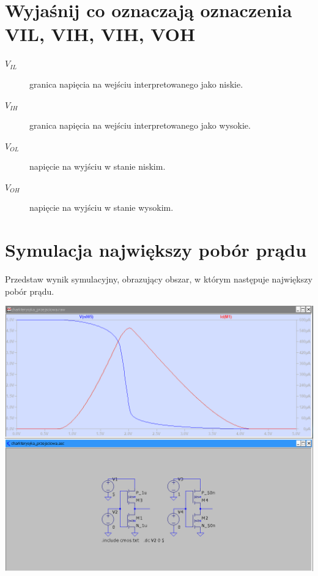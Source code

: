 \documentclass[a4paper, 11pt]{article}
\begin{document}

\section{Wyjaśnij co oznaczają oznaczenia VIL, VIH, VIH, VOH}\label{sec:oznaczenia} %

\begin{description}
	\item[$V_{IL}$] granica napięcia na wejściu interpretowanego jako niskie.
	\item[$V_{IH}$] granica napięcia na wejściu interpretowanego jako wysokie.
	\item[$V_{OL}$] napięcie na wyjściu w stanie niskim.
	\item[$V_{OH}$] napięcie na wyjściu w stanie wysokim.
\end{description}


\section{Symulacja największy pobór prądu}\label{sec:poborpradu} %
Przedstaw wynik symulacyjny, obrazujący obszar, w którym następuje największy pobór prądu.

\begin{center}
	\includegraphics[scale=0.4]{images/pobor_pradu.png}
\end{center}
\end{document}
